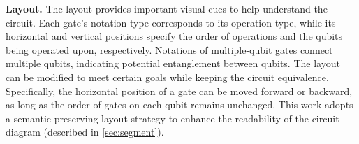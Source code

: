 \textbf{Layout.}
The layout provides important visual cues to help understand the circuit.
Each gate's notation type corresponds to its operation type, while its horizontal and vertical positions specify the order of operations and the qubits being operated upon, respectively.
Notations of multiple-qubit gates connect multiple qubits, indicating potential entanglement between qubits.
The layout can be modified to meet certain goals while keeping the circuit equivalence.
Specifically, the horizontal position of a gate can be moved forward or backward, as long as the order of gates on each qubit remains unchanged.
This work adopts a semantic-preserving layout strategy to enhance the readability of the circuit diagram (described in \cref{sec:segment}).



